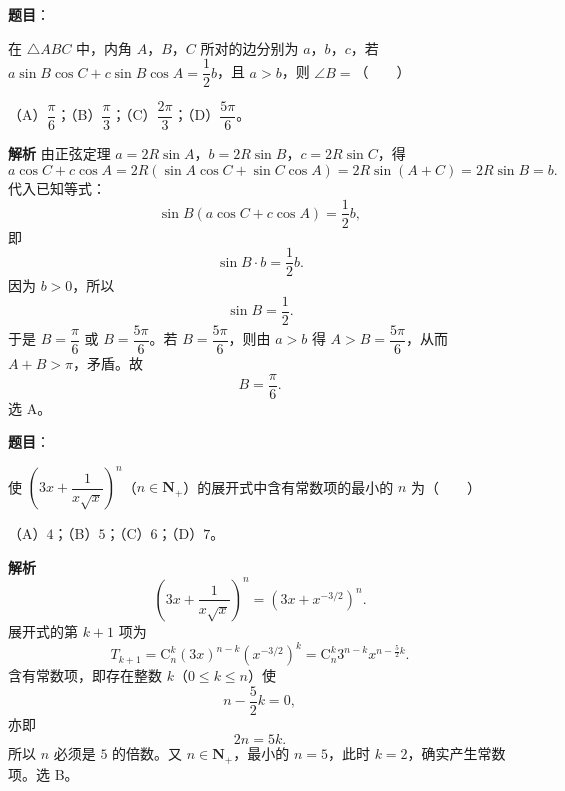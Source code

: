 \begin{answer}

\textbf{题目}：

在 $\triangle ABC$ 中，内角 $A$，$B$，$C$ 所对的边分别为 $a$，$b$，$c$，若 $a\sin B\cos C+c\sin B\cos A=\dfrac12b$，且 $a>b$，则 $\angle B=$\mbox{（　　）}

（A）$\dfrac{\pi}6$；（B）$\dfrac{\pi}3$；（C）$\dfrac{2\pi}3$；（D）$\dfrac{5\pi}6$。

\textbf{解析}
由正弦定理 $a=2R\sin A$，$b=2R\sin B$，$c=2R\sin C$，得
\nopagebreak[4]
\[a\cos C+c\cos A=2R(\sin A\cos C+\sin C\cos A)=2R\sin(A+C)=2R\sin B=b.\]
代入已知等式：
\nopagebreak[4]
\[\sin B(a\cos C+c\cos A)=\frac12b,\]
即
\nopagebreak[4]
\[\sin B\cdot b=\frac12b.\]
因为 $b>0$，所以
\nopagebreak[4]
\[\sin B=\frac12.\]
于是 $B=\dfrac{\pi}6$ 或 $B=\dfrac{5\pi}6$。若 $B=\dfrac{5\pi}6$，则由 $a>b$ 得 $A>B=\dfrac{5\pi}6$，从而 $A+B>\pi$，矛盾。故
\nopagebreak[4]
\[B=\frac{\pi}6.\]
选 A。


\end{answer}
\begin{answer}

\textbf{题目}：

使 $\left(3x+\dfrac{1}{x\sqrt{x}}\right)^n$（$n\in\mathbf N_+$）的展开式中含有常数项的最小的 $n$ 为\mbox{（　　）}

（A）$4$；（B）$5$；（C）$6$；（D）$7$。

\textbf{解析}
\nopagebreak[4]
\[\left(3x+\frac1{x\sqrt x}\right)^n=\left(3x+x^{-3/2}\right)^n.\]
展开式的第 $k+1$ 项为
\nopagebreak[4]
\[T_{k+1}=\mathrm C_n^k(3x)^{n-k}\left(x^{-3/2}\right)^k
=\mathrm C_n^k3^{n-k}x^{n-\frac52k}.\]
含有常数项，即存在整数 $k$（$0\leqslant k\leqslant n$）使
\nopagebreak[4]
\[n-\frac52k=0,\]
亦即
\nopagebreak[4]
\[2n=5k.\]
所以 $n$ 必须是 $5$ 的倍数。又 $n\in\mathbf N_+$，最小的 $n=5$，此时 $k=2$，确实产生常数项。选 B。


\end{answer}
